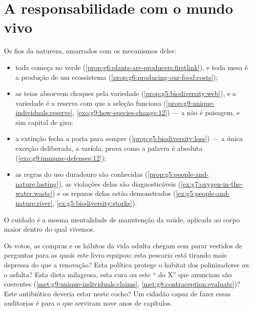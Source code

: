 \section{A responsabilidade com o mundo vivo}

\begin{proposition}\label{prop:g9:our-responsibility:stewardship}
Os fios da natureza, amarrados com os mecanismos deles:
\begin{itemize}
  \item toda  começa no verde
        (\cref{prop:g6:plants-are-producers:firstlink}), e
        toda mesa é a produção de um ecossistema
        (\cref{prop:g6:producing-our-food:costs});
  \item as teias absorvem choques pela variedade
        (\cref{prop:g5:biodiversity:web}), e a variedade é a
        reserva com que a seleção funciona
        (\cref{prop:g9:unique-individuals:reserve},
        \cref{exo:g9:how-species-change:12}) --- a
         não é paisagem, e sim capital de giro;
  \item a extinção fecha a porta para sempre
        (\cref{prop:g5:biodiversity:loss}) --- a única
        exceção deliberada, a varíola, prova como a palavra é
        absoluta (\cref{exo:g9:immune-defenses:12});
  \item as regras do uso duradouro são conhecidas
        (\cref{prop:g5:people-and-nature:lasting}), as
        violações delas são diagnosticáveis
        (\cref{ex:g7:oxygen-in-the-water:waste}) e os reparos
        delas estão demonstrados
        (\cref{ex:g5:people-and-nature:river},
        \cref{ex:g5:biodiversity:storks}).
\end{itemize}
O cuidado é a mesma mentalidade de manutenção da saúde,
aplicada ao corpo maior dentro do qual vivemos.
\end{proposition}
\admitted

\begin{example}\label{ex:g9:our-responsibility:citizen}
Os votos, as compras e os hábitos da vida adulta chegam sem
parar vestidos de perguntas para as quais este livro equipou:
esta pescaria está tirando mais depressa do que a renovação?
Esta política protege o habitat dos polinizadores ou o
asfalta? Esta dieta milagrosa, esta cura ou este `` do
X'' que anunciam são coerentes
(\cref{met:g9:unique-individuals:claims},
\cref{met:g8:contraception:evaluate})? Este antibiótico
deveria estar neste cocho? Um cidadão capaz de fazer essas
auditorias é para o que serviram nove anos de capítulos.
\end{example}

